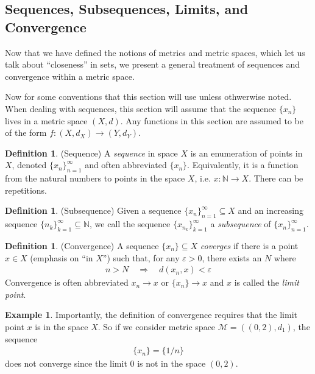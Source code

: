 \documentclass[12pt]{article}
\numberwithin{equation}{section} %
\theoremstyle{plain}
\theoremstyle{definition}
\newtheorem{defn}[thm]{Definition}
\newtheorem{ex}[thm]{Example}
\theoremstyle{remark}
\begin{document}
\clearpage
\subsection{Sequences, Subsequences, Limits, and Convergence}

Now that we have defined the notions of metrics and metric spaces, which
let us talk about ``closeness'' in sets, we present a general treatment
of sequences and convergence within a metric space.

Now for some conventions that this section will use unless othwerwise
noted.  When dealing with sequences, this section will assume that the
sequence $\{x_n\}$ lives in a metric space $(X,d)$. Any functions in
this section are assumed to be of the form $f:(X,d_X)\rightarrow
(Y,d_Y)$.

\begin{defn}{(Sequence)}
A \emph{sequence} in space $X$ is an enumeration of points in $X$,
denoted $\{x_n\}_{n=1}^\infty$ and often abbreviated $\{x_n\}$.
Equivalently, it is a function from the natural numbers to points in the
space $X$, i.e.  $x:\mathbb{N}\rightarrow X$. There can be repetitions.
\end{defn}

\begin{defn}{(Subsequence)}
Given a sequence $\{x_n\}_{n=1}^\infty \subseteq X$ and an increasing
sequence $\{n_k\}_{k=1}^\infty \subseteq \mathbb{N}$, we call the
sequence $\{x_{n_k}\}_{k=1}^\infty$ a \emph{subsequence} of
$\{x_n\}_{n=1}^\infty$.
\end{defn}

\begin{defn}{(Convergence)}
\label{defn:convergence}
A sequence $\{x_n\}\subseteq X$ \emph{coverges}  if there is a point
$x\in X$ (emphasis on ``in $X$'') such that, for any $\varepsilon>0$,
there exists an $N$ where
\begin{align*}
  n > N \quad \Rightarrow\quad
  d(x_n,x) < \varepsilon
\end{align*}
Convergence is often abbreviated $x_n\rightarrow x$ or
$\{x_n\}\rightarrow x$ and $x$ is called the \emph{limit point}.
\end{defn}

\begin{ex}
Importantly, the definition of convergence requires that the
limit point $x$ is in the space $X$. So if we consider metric space
$\mathscr{M}=((0,2),d_1)$, the sequence
\begin{align*}
  \{x_n\} = \{1/n\}
\end{align*}
does not converge since the limit $0$ is not in the space $(0,2)$.
\end{ex}
\end{document}
